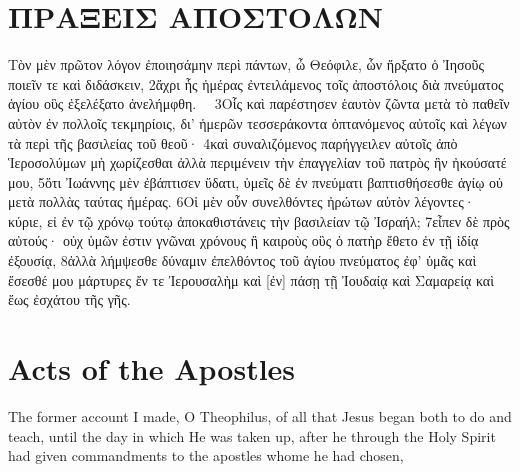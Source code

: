 
\begin{multicols}{2}
    \section{ΠΡΑΞΕΙΣ ΑΠΟΣΤΟΛΩΝ}
Τὸν μὲν πρῶτον λόγον ἐποιησάμην περὶ πάντων, ὦ Θεόφιλε, ὧν ἤρξατο ὁ Ἰησοῦς ποιεῖν τε καὶ διδάσκειν, 2ἄχρι ἧς ἡμέρας ἐντειλάμενος τοῖς ἀποστόλοις διὰ πνεύματος ἁγίου οὓς ἐξελέξατο ἀνελήμφθη.  3Οἷς καὶ παρέστησεν ἑαυτὸν ζῶντα μετὰ τὸ παθεῖν αὐτὸν ἐν πολλοῖς τεκμηρίοις, δι’ ἡμερῶν τεσσεράκοντα ὀπτανόμενος αὐτοῖς καὶ λέγων τὰ περὶ τῆς βασιλείας τοῦ θεοῦ· 4καὶ συναλιζόμενος παρήγγειλεν αὐτοῖς ἀπὸ Ἱεροσολύμων μὴ χωρίζεσθαι ἀλλὰ περιμένειν τὴν ἐπαγγελίαν τοῦ πατρὸς ἣν ἠκούσατέ μου, 5ὅτι Ἰωάννης μὲν ἐβάπτισεν ὕδατι, ὑμεῖς δὲ ἐν πνεύματι βαπτισθήσεσθε ἁγίῳ οὐ μετὰ πολλὰς ταύτας ἡμέρας. 6Οἱ μὲν οὖν συνελθόντες ἠρώτων αὐτὸν λέγοντες· κύριε, εἰ ἐν τῷ χρόνῳ τούτῳ ἀποκαθιστάνεις τὴν βασιλείαν τῷ Ἰσραήλ; 7εἶπεν δὲ πρὸς αὐτούς· οὐχ ὑμῶν ἐστιν γνῶναι χρόνους ἢ καιροὺς οὓς ὁ πατὴρ ἔθετο ἐν τῇ ἰδίᾳ ἐξουσίᾳ, 8ἀλλὰ λήμψεσθε δύναμιν ἐπελθόντος τοῦ ἁγίου πνεύματος ἐφ’ ὑμᾶς καὶ ἔσεσθέ μου μάρτυρες ἔν τε Ἰερουσαλὴμ καὶ [ἐν] πάσῃ τῇ Ἰουδαίᾳ καὶ Σαμαρείᾳ καὶ ἕως ἐσχάτου τῆς γῆς.
\vfill\null
\columnbreak
    \section*{Acts of the Apostles}
    The former account I made, O Theophilus, of all that Jesus began both to do and teach, until the day in which He was taken up, after he through the Holy Spirit had given commandments to the apostles whome he had chosen,
\end{multicols}
